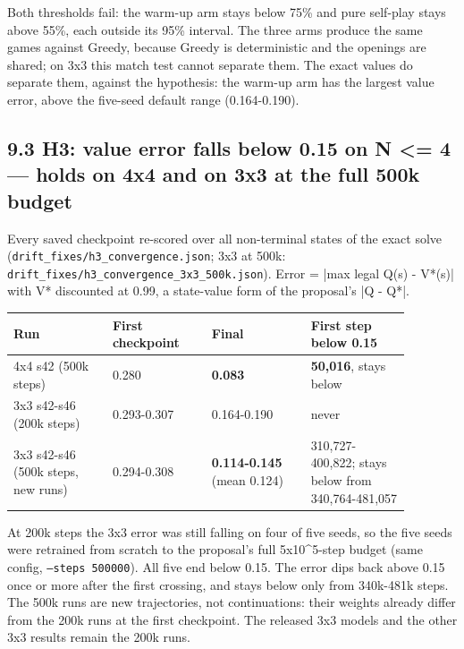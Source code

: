 \documentclass[11pt]{article}
\begin{document}
Both thresholds fail: the warm-up arm stays below 75\% and pure self-play stays above 55\%, each
outside its 95\% interval. The three arms produce the same games against Greedy, because Greedy is
deterministic and the openings are shared; on 3x3 this match test cannot separate them. The exact
values do separate them, against the hypothesis: the warm-up arm has the largest value error,
above the five-seed default range (0.164-0.190).

\subsection{9.3 H3: value error falls below 0.15 on N <= 4 — holds on 4x4 and on 3x3 at the full 500k budget}

Every saved checkpoint re-scored over all non-terminal states of the exact solve
(\texttt{drift\_fixes/h3\_convergence.json}; 3x3 at 500k: \texttt{drift\_fixes/h3\_convergence\_3x3\_500k.json}). Error = |max legal Q(s) - V*(s)| with V* discounted at
0.99, a state-value form of the proposal's |Q - Q*|.

\begin{center}\scriptsize
\begin{longtable}{p{0.22\linewidth}p{0.22\linewidth}p{0.22\linewidth}p{0.22\linewidth}}
\toprule
Run & First checkpoint & Final & First step below 0.15 \\
\midrule
4x4 s42 (500k steps) & 0.280 & \textbf{0.083} & \textbf{50,016}, stays below \\
3x3 s42-s46 (200k steps) & 0.293-0.307 & 0.164-0.190 & never \\
3x3 s42-s46 (500k steps, new runs) & 0.294-0.308 & \textbf{0.114-0.145} (mean 0.124) & 310,727-400,822; stays below from 340,764-481,057 \\
\bottomrule
\end{longtable}
\end{center}

At 200k steps the 3x3 error was still falling on four of five seeds, so the five seeds were retrained
from scratch to the proposal's full 5x10\textasciicircum{}5-step budget (same config, \texttt{--steps 500000}). All five end
below 0.15. The error dips back above 0.15 once or more after the first crossing, and stays below only
from 340k-481k steps. The 500k runs are new trajectories, not continuations: their weights already
differ from the 200k runs at the first checkpoint. The released 3x3 models and the other 3x3 results
remain the 200k runs.
\end{document}
